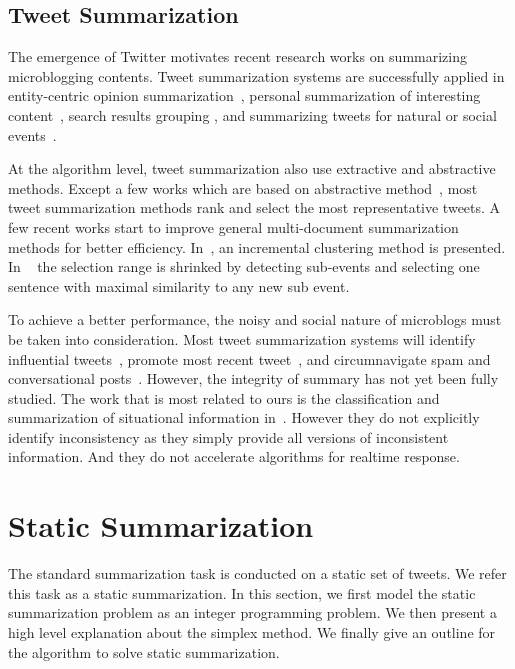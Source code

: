 \documentclass{llncs}
\begin{document}
\subsection{Tweet Summarization}
The emergence of Twitter motivates recent research works on summarizing microblogging contents. Tweet summarization systems are successfully applied in entity-centric opinion summarization~\cite{Meng2012Entitycentric}, personal summarization of interesting content~\cite{Ren2013Personalized,Chin2017TOTEM}, search results grouping \cite{Mathioudakis2010TwitterMonitor}, and summarizing tweets for natural or social events~\cite{Takamura2011Summarizing,Lin2012Generating,Rudra2015Extracting,Shou2013Sumblr,Liu2016LEDS,Gillani2017Post,Zubiaga2012Towards}.

At the algorithm level, tweet summarization also use extractive and abstractive methods. Except a few works which are based on abstractive method~\cite{Sharifi2010Summarizing}, most tweet summarization methods rank and select the most representative tweets. A few recent works start to improve general multi-document summarization methods for better efficiency. In~\cite{Shou2013Sumblr}, an incremental clustering method is presented. In ~\cite{Zubiaga2012Towards} the selection range is shrinked by detecting sub-events and selecting one sentence with maximal similarity to any new sub event.

To achieve a better performance, the noisy and social nature of microblogs must be taken into consideration. Most tweet summarization systems will identify influential tweets~\cite{Hannon2010Recommending},  promote most recent tweet~\cite{Efron2011Estimation}, and circumnavigate spam and conversational posts~\cite{Gillani2017Post}. However, the integrity of summary has not yet been fully studied. The work that is most related to ours is the 
classification and summarization of situational information in~\cite{Rudra2015Extracting,Rudra2016Summarizing}. However they do not explicitly identify inconsistency as they simply provide all versions of inconsistent information. And they do not accelerate algorithms for realtime response. 


\section{Static Summarization}\label{sec:static}
%
The standard summarization task is conducted on a static set of tweets. We refer this task as a static summarization. In this section, we first model the static summarization problem as an integer programming problem. We then present a high level explanation about the simplex method. We finally give an outline for the algorithm to solve static summarization.
\end{document}
